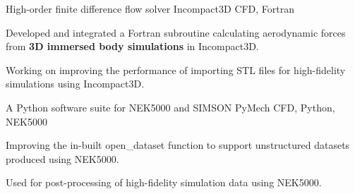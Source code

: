 

\begin{cventries}
  \cventry
  {High-order finite difference flow solver} %
  {Incompact3D} %
  {CFD, Fortran} %
  {} %
  {
    \begin{cvitems} %
      \item {Developed and integrated a Fortran subroutine calculating aerodynamic forces from \textbf{3D immersed body simulations} in Incompact3D.}
      \item {Working on improving the performance of importing STL files for high-fidelity simulations using Incompact3D.}
    \end{cvitems}
  }

  \cventry
  {A Python software suite for NEK5000 and SIMSON} %
  {PyMech} %
  {CFD, Python, NEK5000} %
  {} %
  {
    \begin{cvitems} %
      \item {Improving the in-built open\_dataset function to support unstructured datasets produced using NEK5000.}
      \item {Used for post-processing of high-fidelity simulation data using NEK5000.}
    \end{cvitems}
  }


\end{cventries}
